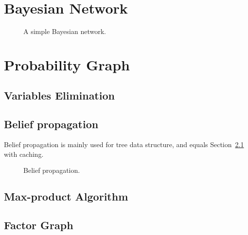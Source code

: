 \section{Bayesian Network} %
\label{sec:Bayesian Network}

\begin{figure}
	\centering
	
	\caption{A simple Bayesian network.}\label{fig:bn_simple_graph}
\end{figure}


\section{Probability Graph} %
\label{sec:Probability Graph}


\subsection{Variables Elimination} %
\label{sub:Variables Elimination}


\subsection{Belief propagation} %
\label{sub:Belief propagation}

Belief propagation is mainly used for tree data structure, and equals Section~\ref{sub:Variables Elimination} with caching.

\begin{figure}
	\centering
	
	\caption{Belief propagation.}
	\label{fig:belief_propagation}
\end{figure}


\subsection{Max-product Algorithm} %
\label{sub:Max-product Algorithm}


\subsection{Factor Graph} %
\label{sub:Factor Graph}

